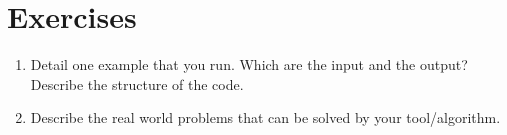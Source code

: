 \documentclass[a4paper,12pt]{report}
\begin{document}
\section{Exercises}
\begin{enumerate}
 \item Detail one example that you run. Which are the input and the output? 
 Describe the structure of the code. 
 \item Describe the real world problems that can be solved by your tool/algorithm.
\end{enumerate}

\vspace{0.5cm}

\fbox{\begin{minipage}{16cm}
 
\end{minipage}}
\vspace{0.5cm}

 
\end{document}
